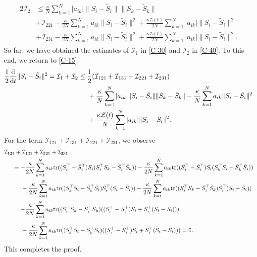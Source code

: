 \documentclass[11pt,reqno]{amsart}
\numberwithin{figure}{section}
\newcommand{\kp}{\kappa}
\newcommand{\dd}{  {\textup{d}} }
\newcommand{\dt} {    {  \textup{d}t   }    }
\newcommand{\tr}{{\textup{tr}}}
\begin{document}
\begin{align}  \label{C-40}
\begin{aligned}
 2\mathcal I_2 & \leq \frac\kp N \sum_{k=1}^N |a_{ik}| \|S_i - \tilde S_i \| \|S_k - \tilde S_k\| \\
& + \mathcal I_{221}   -\frac{\kp}{2N} \sum_{k=1}^N a_{ik} \|S_i  - \tilde S_i\|^2 + \frac{\kp \mathcal Z(t)}{2N} \sum_{k=1}^N |a_{ik} | \|S_i - \tilde S_i\|^2 \\
& +\mathcal I_{231}   -\frac{\kp}{2N} \sum_{k=1}^N a_{ik} \|S_i  - \tilde S_i\|^2 + \frac{\kp \mathcal Z(t)}{2N} \sum_{k=1}^N |a_{ik} | \|S_i - \tilde S_i\|^2.
\end{aligned} 
\end{align} 
So far, we have obtained the estimates of $\mathcal I_1$ in \eqref{C-30}   and $\mathcal I_2$ in \eqref{C-40}. To this end, we return to \eqref{C-15}: 
\begin{align} \label{C-42}
\begin{aligned}
\frac12\frac\dd\dt \|S_i - \tilde S_i\|^2 = \mathcal I_1 + \mathcal I_2  &\leq  \frac{1}{2}(\mathcal I_{121} + \mathcal I_{131} + \mathcal I_{221} + \mathcal I_{231} ) \\
&\hspace{0.5cm}+ \frac{\kp}{N} \sum_{k=1}^N |a_{ik}| \|S_i-\tilde S_i\| \|S_k - \tilde S_k\|  -\frac{\kp}{N} \sum_{k=1}^N a_{ik} \|S_i - \tilde S_i\|^2 \\
&\hspace{0.5cm}+ \frac{\kp \mathcal Z(t)}{N} \sum_{k=1}^N |a_{ik}|\|S_i - \tilde S_i\|^2.
\end{aligned}
\end{align} 
For the term $\mathcal I_{121} + \mathcal I_{131} + \mathcal I_{221} + \mathcal I_{231}$, we observe 
\begin{align*}
 &\mathcal I_{121} + \mathcal I_{131} + \mathcal I_{221} + \mathcal I_{231}  \\
&\hspace{0.5cm} = -\frac{\kp}{2N} \sum_{k=1}^N a_{ik} \tr( ( S_i ^\top - \tilde S_i^\top) S_i ( S_i^\top S_k - \tilde S_i^\top \tilde S_k)) -\frac{\kp}{2N} \sum_{k=1}^N a_{ik} \tr(( S_i^\top - \tilde S_i^\top)S_i(S_k^\top S_i - \tilde S_k^\top \tilde S_i))  \\
&\hspace{1cm}  -\frac{\kp}{2N} \sum_{k=1}^N a_{ik} \tr( ( S_k^\top S_i - \tilde S_k^\top \tilde S_i) \tilde S_i^\top ( S_i -\tilde S_i))  -\frac{\kp}{2N} \sum_{k=1}^N a_{ik} \tr(( S_i^\top S_k - \tilde S_i^\top \tilde S_k)\tilde S_i^\top ( S_i - \tilde S_i))  \\
& \hspace{0.5cm}= -\frac{\kp}{2N} \sum_{k=1}^N a_{ik} \tr(( S_i^\top S_k - \tilde S_i^\top \tilde S_k) (( S_i^\top - \tilde S_i^\top) S_i  + \tilde S_i^\top ( S_i - \tilde S_i))) \\
& \hspace{1cm}- \frac{\kp}{2N} \sum_{k=1}^N a_{ik} \tr(( S_k^\top S_i - \tilde S_k^\top \tilde S_i) ( ( S_i^\top - \tilde S_i^\top ) S_i  + \tilde S_i^\top ( S_i - \tilde S_i))) =0. 
\end{align*} 
This completes the proof. 
    
\end{document}
